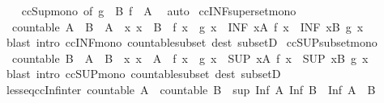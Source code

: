 \begin{isabellebody}
%
\isadelimproof
\ \ %
\endisadelimproof
%
\isatagproof
{}\isamarkupfalse%
\ ccSup{\isacharunderscore}mono\ {\isacharbrackleft}of\ {\isachardoublequoteopen}g\ {\isacharbackquote}\ B{\isachardoublequoteclose}\ {\isachardoublequoteopen}f\ {\isacharbackquote}\ A{\isachardoublequoteclose}{\isacharbrackright}\ \isamarkupfalse%
\ auto%
\endisatagproof
{\isafoldproof}%
%
\isadelimproof
\isanewline
%
\endisadelimproof
\isanewline
{}\isamarkupfalse%
\ ccINF{\isacharunderscore}superset{\isacharunderscore}mono{\isacharcolon}\isanewline
\ \ {\isachardoublequoteopen}countable\ A\ {\isasymLongrightarrow}\ B\ {\isasymsubseteq}\ A\ {\isasymLongrightarrow}\ {\isacharparenleft}{\isasymAnd}x{\isachardot}\ x\ {\isasymin}\ B\ {\isasymLongrightarrow}\ f\ x\ {\isasymle}\ g\ x{\isacharparenright}\ {\isasymLongrightarrow}\ {\isacharparenleft}INF\ x{\isacharcolon}A{\isachardot}\ f\ x{\isacharparenright}\ {\isasymle}\ {\isacharparenleft}INF\ x{\isacharcolon}B{\isachardot}\ g\ x{\isacharparenright}{\isachardoublequoteclose}\isanewline
%
\isadelimproof
\ \ %
\endisadelimproof
%
\isatagproof
{}\isamarkupfalse%
\ {\isacharparenleft}blast\ intro{\isacharcolon}\ ccINF{\isacharunderscore}mono\ countable{\isacharunderscore}subset\ dest{\isacharcolon}\ subsetD{\isacharparenright}%
\endisatagproof
{\isafoldproof}%
%
\isadelimproof
\isanewline
%
\endisadelimproof
\isanewline
{}\isamarkupfalse%
\ ccSUP{\isacharunderscore}subset{\isacharunderscore}mono{\isacharcolon}\isanewline
\ \ {\isachardoublequoteopen}countable\ B\ {\isasymLongrightarrow}\ A\ {\isasymsubseteq}\ B\ {\isasymLongrightarrow}\ {\isacharparenleft}{\isasymAnd}x{\isachardot}\ x\ {\isasymin}\ A\ {\isasymLongrightarrow}\ f\ x\ {\isasymle}\ g\ x{\isacharparenright}\ {\isasymLongrightarrow}\ {\isacharparenleft}SUP\ x{\isacharcolon}A{\isachardot}\ f\ x{\isacharparenright}\ {\isasymle}\ {\isacharparenleft}SUP\ x{\isacharcolon}B{\isachardot}\ g\ x{\isacharparenright}{\isachardoublequoteclose}\isanewline
%
\isadelimproof
\ \ %
\endisadelimproof
%
\isatagproof
{}\isamarkupfalse%
\ {\isacharparenleft}blast\ intro{\isacharcolon}\ ccSUP{\isacharunderscore}mono\ countable{\isacharunderscore}subset\ dest{\isacharcolon}\ subsetD{\isacharparenright}%
\endisatagproof
{\isafoldproof}%
%
\isadelimproof
\isanewline
%
\endisadelimproof
\isanewline
\isanewline
{}\isamarkupfalse%
\ less{\isacharunderscore}eq{\isacharunderscore}ccInf{\isacharunderscore}inter{\isacharcolon}\ {\isachardoublequoteopen}countable\ A\ {\isasymLongrightarrow}\ countable\ B\ {\isasymLongrightarrow}\ sup\ {\isacharparenleft}Inf\ A{\isacharparenright}\ {\isacharparenleft}Inf\ B{\isacharparenright}\ {\isasymle}\ Inf\ {\isacharparenleft}A\ {\isasyminter}\ B{\isacharparenright}{\isachardoublequoteclose}\isanewline

\end{isabellebody}
